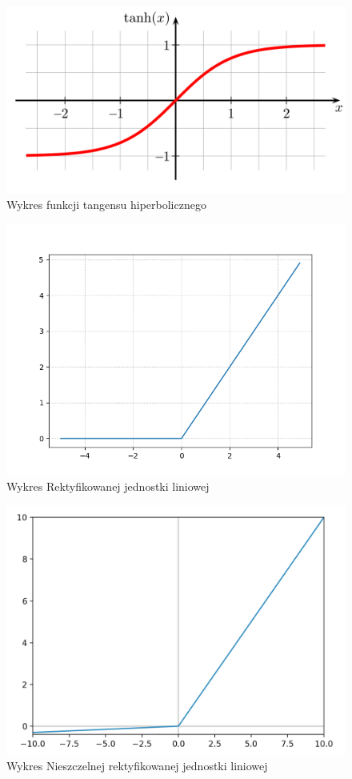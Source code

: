 \documentclass[12pt,a4paper,twoside,titlepage,openright]{book}
\begin{document}
\begin{figure}[h]
	\centering
			\includegraphics[resolution=100, scale=0.3]{Tangens.png}
		\caption{Wykres funkcji tangensu hiperbolicznego}
\end{figure}

\begin{figure}[h]
	\centering
			\includegraphics[resolution=100, scale=0.3]{ReLU.png}
		\caption{Wykres Rektyfikowanej jednostki liniowej}
\end{figure}

\begin{figure}[h]
	\centering
			\includegraphics[resolution=100, scale=0.3]{leakyReLU.png}
		\caption{Wykres Nieszczelnej rektyfikowanej jednostki liniowej}
\end{figure}
\end{document}
